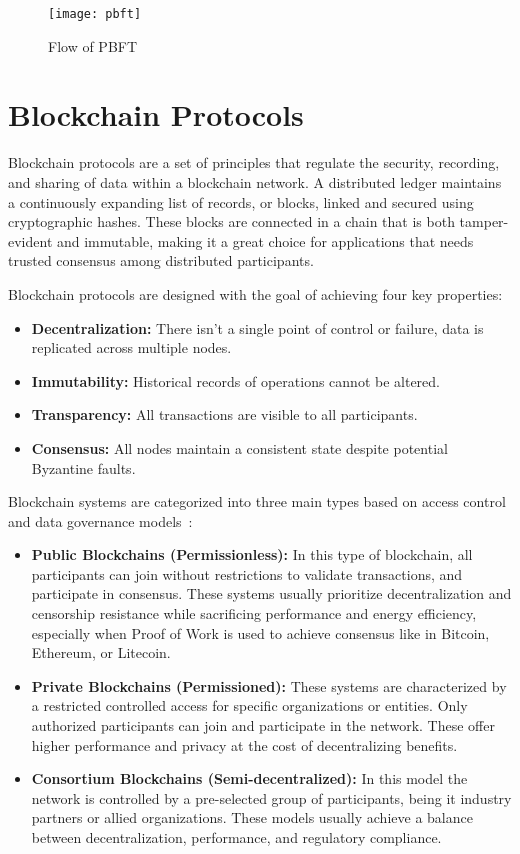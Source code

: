 \begin{figure}[h]
	\centering
	\texttt{[image: pbft]}
	\caption{Flow of PBFT}
	\label{fig:pbft}
\end{figure}

\section{Blockchain Protocols}\label{sec:blockchain}

Blockchain protocols are a set of principles that regulate the security, recording, and sharing of data
within a blockchain network. A distributed ledger
maintains a continuously expanding list of records, or blocks, linked and secured using
cryptographic hashes. These blocks are connected in a chain
that is both tamper-evident and immutable, making it a great choice for applications that
needs trusted consensus among distributed participants.

Blockchain protocols are designed with the goal of achieving four key properties:
\begin{itemize}
  \item \textbf{Decentralization:} There isn't a single point of control or failure,
  data is replicated across multiple nodes.
  \item \textbf{Immutability:} Historical records of operations cannot be altered.
  \item \textbf{Transparency:} All transactions are visible to all participants.
  \item \textbf{Consensus:} All nodes maintain a consistent state despite potential Byzantine faults.
\end{itemize}

Blockchain systems are categorized into three main types based on access control and data
governance models~\cite{blockchain_consensus}:

\begin{itemize}
  \item \textbf{Public Blockchains (Permissionless):} In this type of blockchain, all participants can join without restrictions to
  validate transactions, and participate in consensus. These systems usually
  prioritize decentralization and censorship resistance while sacrificing performance and energy efficiency,
  especially when Proof of Work is used to achieve consensus like in Bitcoin, Ethereum, or Litecoin.

  \item \textbf{Private Blockchains (Permissioned):} These systems are characterized by a restricted controlled access for specific
  organizations or entities. Only authorized participants can join and participate in the network.
  These offer higher performance and privacy at the cost of decentralizing benefits.

  \item \textbf{Consortium Blockchains (Semi-decentralized):} In this model the network is
  controlled by a pre-selected group of participants, being it industry partners or allied organizations.
  These models usually achieve a balance between decentralization, performance, and regulatory compliance.
\end{itemize}

